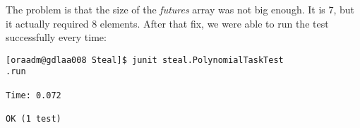 \hfill
\par
The problem is that the size of the \textit{futures} array was not big enough.
It is 7, but it actually required 8 elements. After that fix, we were able to
run the test successfully every time:
\par
\hfill
\begin{verbatim}
[oraadm@gdlaa008 Steal]$ junit steal.PolynomialTaskTest
.run

Time: 0.072

OK (1 test)
\end{verbatim}
\hfill
\par
